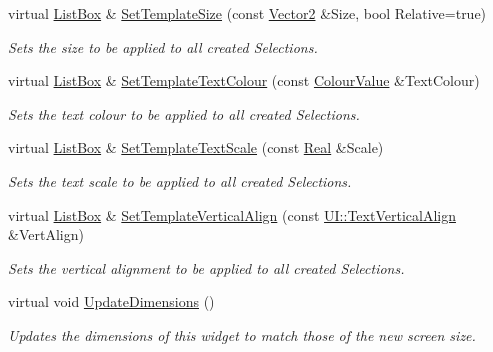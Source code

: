 \begin{DoxyCompactItemize}
virtual \hyperlink{classMezzanine_1_1UI_1_1ListBox}{ListBox} \& \hyperlink{classMezzanine_1_1UI_1_1ListBox_af96485460545e5c77ae3b8640c274f0a}{SetTemplateSize} (const \hyperlink{classMezzanine_1_1Vector2}{Vector2} \&Size, bool Relative=true)
\begin{DoxyCompactList}\small\item\em Sets the size to be applied to all created Selections. \item\end{DoxyCompactList}\item 
virtual \hyperlink{classMezzanine_1_1UI_1_1ListBox}{ListBox} \& \hyperlink{classMezzanine_1_1UI_1_1ListBox_aa60c0565e8f114162d90de6ef646becf}{SetTemplateTextColour} (const \hyperlink{classMezzanine_1_1ColourValue}{ColourValue} \&TextColour)
\begin{DoxyCompactList}\small\item\em Sets the text colour to be applied to all created Selections. \item\end{DoxyCompactList}\item 
virtual \hyperlink{classMezzanine_1_1UI_1_1ListBox}{ListBox} \& \hyperlink{classMezzanine_1_1UI_1_1ListBox_a220465a3c68071ad7b168f98ac191cd3}{SetTemplateTextScale} (const \hyperlink{namespaceMezzanine_a726731b1a7df72bf3583e4a97282c6f6}{Real} \&Scale)
\begin{DoxyCompactList}\small\item\em Sets the text scale to be applied to all created Selections. \item\end{DoxyCompactList}\item 
virtual \hyperlink{classMezzanine_1_1UI_1_1ListBox}{ListBox} \& \hyperlink{classMezzanine_1_1UI_1_1ListBox_a985a72063a7aa760c2aebd562b7adfa9}{SetTemplateVerticalAlign} (const \hyperlink{namespaceMezzanine_1_1UI_ab35e3845e2541698245262cc17147ae9}{UI::TextVerticalAlign} \&VertAlign)
\begin{DoxyCompactList}\small\item\em Sets the vertical alignment to be applied to all created Selections. \item\end{DoxyCompactList}\item 
virtual void \hyperlink{classMezzanine_1_1UI_1_1ListBox_a7bad6cce9fa22e882cc74f62a51fabdb}{UpdateDimensions} ()
\begin{DoxyCompactList}\small\item\em Updates the dimensions of this widget to match those of the new screen size. \item\end{DoxyCompactList}\end{DoxyCompactItemize}
